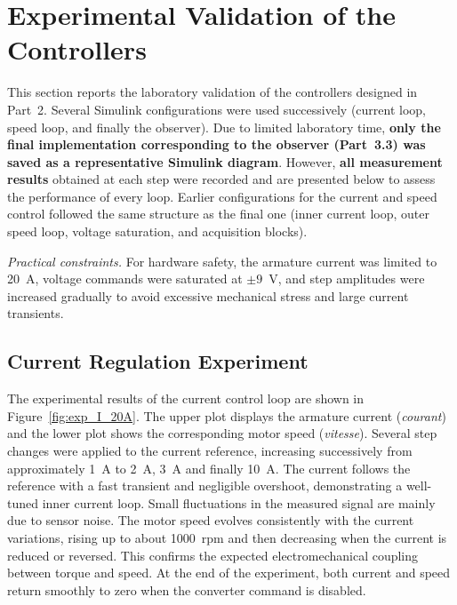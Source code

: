 \documentclass{rapportCS}
\begin{document}
\newpage

\section{Experimental Validation of the Controllers}

\label{sec:exp}

This section reports the laboratory validation of the controllers designed in Part~2. 
Several Simulink configurations were used successively (current loop, speed loop, and finally the observer). 
Due to limited laboratory time, \textbf{only the final implementation corresponding to the observer (Part~3.3) was saved as a representative Simulink diagram}. 
However, \textbf{all measurement results} obtained at each step were recorded and are presented below to assess the performance of every loop. 
Earlier configurations for the current and speed control followed the same structure as the final one (inner current loop, outer speed loop, voltage saturation, and acquisition blocks).

\vspace{4pt}
\noindent\textit{Practical constraints.} For hardware safety, the armature current was limited to 20~A, voltage commands were saturated at $\pm9$~V, and step amplitudes were increased gradually to avoid excessive mechanical stress and large current transients.

\subsection{Current Regulation Experiment}

The experimental results of the current control loop are shown in Figure~\ref{fig:exp_I_20A}. 
The upper plot displays the armature current (\textit{courant}) and the lower plot shows the corresponding motor speed (\textit{vitesse}). 
Several step changes were applied to the current reference, increasing successively from approximately 1~A to 2~A, 3~A and finally 10~A. 
The current follows the reference with a fast transient and negligible overshoot, demonstrating a well-tuned inner current loop. 
Small fluctuations in the measured signal are mainly due to sensor noise. 
The motor speed evolves consistently with the current variations, rising up to about 1000~rpm and then decreasing when the current is reduced or reversed. 
This confirms the expected electromechanical coupling between torque and speed. 
At the end of the experiment, both current and speed return smoothly to zero when the converter command is disabled.
\end{document}
